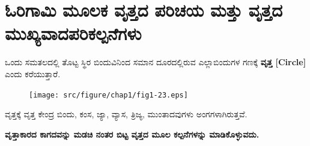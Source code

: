  
\section{ಓರಿಗಾಮಿ ಮೂಲಕ ವೃತ್ತದ ಪರಿಚಯ ಮತ್ತು ವೃತ್ತದ ಮುಖ್ಯವಾದ\break ಪರಿಕಲ್ಪನೆಗಳು}\label{sec1.12}%
 

ಒಂದು ಸಮತಲದಲ್ಲಿ ತೊಟ್ಟ ಸ್ಥಿರ ಬಿಂದುವಿನಿಂದ ಸಮಾನ ದೂರದಲ್ಲಿರುವ ಎಲ್ಲಾ\break  ಬಿಂದುಗಳ ಗಣಕ್ಕೆ \textbf{ವೃತ್ತ [Circle]} ಎಂದು ಕರೆಯುತ್ತಾರೆ. 
\begin{figure}[H]
\centering
\texttt{[image: src/figure/chap1/fig1-23.eps]}
\end{figure}
 
ವೃತ್ತಕ್ಕೆ ವೃತ್ತ ಕೇಂದ್ರ ಬಿಂದು, ಕಂಸ, ಜ್ಯಾ, ವ್ಯಾಸ, ತ್ರಿಜ್ಯ, ಮುಂತಾದವುಗಳು ಅಂಗಗಳಾಗಿರುತ್ತವೆ. 
 

\noindent
\textbf{ವೃತ್ತಾಕಾರದ ಕಾಗದವನ್ನು ಮಡಚಿ ನಂತರ ಬಿಟ್ಟ ವೃತ್ತದ ಮೂಲ ಕಲ್ಪನೆಗಳನ್ನು ಮಾಡಿಕೊಳ್ಳುವದು.}

